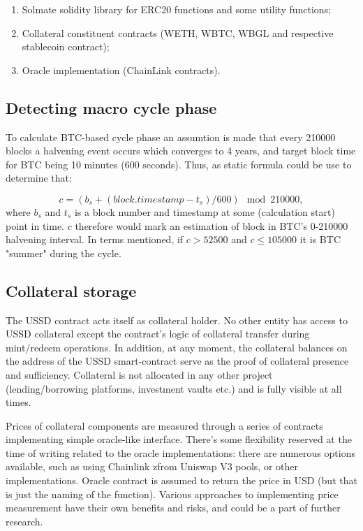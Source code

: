 \begin{enumerate}
  \item Solmate solidity library for ERC20 functions and some utility functions;
  \item Collateral constituent contracts (WETH, WBTC, WBGL and respective stablecoin contract);
  \item Oracle implementation (ChainLink contracts).
\end{enumerate}


\subsection{Detecting macro cycle phase}

To calculate BTC-based cycle phase an assumtion is made that every 210000 blocks a halvening event occurs which converges to 4 years, and target block time for BTC being 10 minutes (600 seconds). Thus, as static formula could be use to determine that:

\[
c = (b_s + (block.timestamp - t_s) / 600) \mod 210000,
\]
where \(b_s\) and \(t_s\) is a block number and timestamp at some (calculation start) point in time.
\(c\) therefore would mark an estimation of block in BTC's 0-210000 halvening interval.
In terms mentioned, if \(c > 52500\) and \(c \le 105000\) it is BTC "summer" during the cycle.


\subsection{Collateral storage}

The USSD contract acts itself as collateral holder. No other entity has access to USSD 
collateral except the contract's logic of collateral transfer during mint/redeem operations. 
In addition, at any moment, the collateral balances on the address of the USSD smart-contract 
serve as the proof of collateral presence and sufficiency. Collateral is not allocated in any other project 
(lending/borrowing platforms, investment vaults etc.) and is fully visible at all times.

Prices of collateral components are measured through a series of contracts implementing simple
oracle-like interface. There's some flexibility reserved at the time of writing related to
the oracle implementations: there are numerous options available, such as using Chainlink
zfrom Uniswap V3 pools, or other implementations. Oracle contract is assumed to return the price
in USD (but that is just the naming of the function). Various approaches to implementing 
price measurement have their own benefits and risks, and could be a part of further research.

